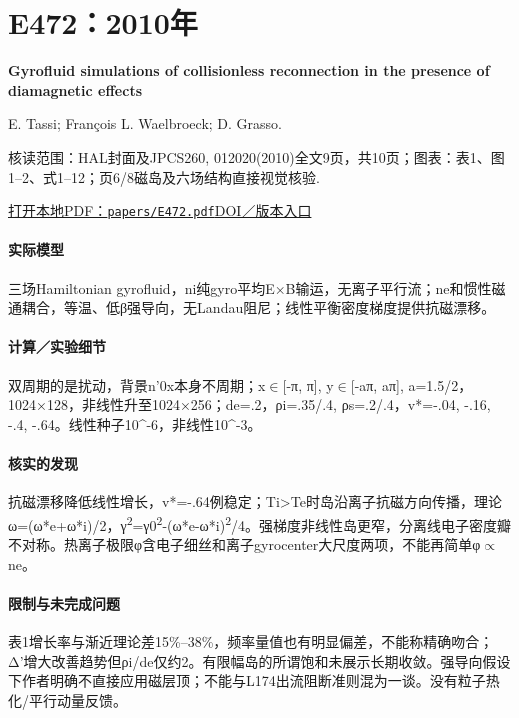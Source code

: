 \section{E472：2010年}\label{paper:E472}

\textbf{Gyrofluid simulations of collisionless reconnection in the presence of diamagnetic effects}\citep{E472}\

E. Tassi;  François L. Waelbroeck;  D. Grasso.

\textsf{核读范围：}HAL封面及JPCS260, 012020(2010)全文9页，共10页；\textsf{图表：}表1、图1–2、式1–12；页6/8磁岛及六场结构直接视觉核验.

\href{run:papers/E472.pdf}{打开本地PDF：\texttt{papers/E472.pdf}}\quad\href{http://porto.polito.it/2380084/1/2380084.pdf}{DOI／版本入口}

\paragraph{实际模型}三场Hamiltonian gyrofluid，ni纯gyro平均E×B输运，无离子平行流；ne和惯性磁通耦合，等温、低β强导向，无Landau阻尼；线性平衡密度梯度提供抗磁漂移。

\paragraph{计算／实验细节}双周期的是扰动，背景n'0x本身不周期；x\ensuremath{\in}[-π, π], y\ensuremath{\in}[-aπ, aπ], a=1.5/2，1024×128，非线性升至1024×256；de=.2，ρi=.35/.4, ρs=.2/.4，v*=-.04, -.16, -.4, -.64。线性种子10\textasciicircum{}-6，非线性10\textasciicircum{}-3。

\paragraph{核实的发现}抗磁漂移降低线性增长，v*=-.64例稳定；Ti>Te时岛沿离子抗磁方向传播，理论ω=(ω*e+ω*i)/2，γ\textsuperscript{2}=γ0\textsuperscript{2}-(ω*e-ω*i)\textsuperscript{2}/4。强梯度非线性岛更窄，分离线电子密度瓣不对称。热离子极限φ含电子细丝和离子gyrocenter大尺度两项，不能再简单φ\ensuremath{\propto}ne。

\paragraph{限制与未完成问题}表1增长率与渐近理论差15\%–38\%，频率量值也有明显偏差，不能称精确吻合；Δ'增大改善趋势但ρi/de仅约2。有限幅岛的所谓饱和未展示长期收敛。强导向假设下作者明确不直接应用磁层顶；不能与L174出流阻断准则混为一谈。没有粒子热化/平行动量反馈。

